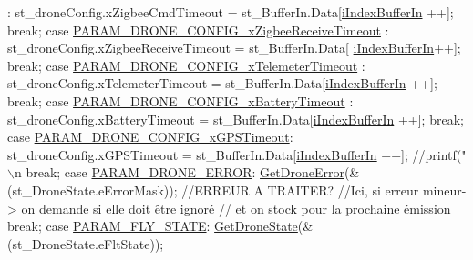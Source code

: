\begin{DoxyCode}
      :
            st\_droneConfig.xZigbeeCmdTimeout = st\_BufferIn.Data[\hyperlink{classZigBee_a2b6ec705974d8db622f3eb00efeb9ad8}{iIndexBufferIn}
      ++];
            \textcolor{keywordflow}{break};
        \textcolor{keywordflow}{case} \hyperlink{typdefUart_8h_a7fdf1e7bfbebe0c7a2eb84a10e069632af2f4da476de6fc43e2118826e9e8bc9b}{PARAM\_DRONE\_CONFIG\_xZigbeeReceiveTimeout}
      :
            st\_droneConfig.xZigbeeReceiveTimeout = st\_BufferIn.Data[
      \hyperlink{classZigBee_a2b6ec705974d8db622f3eb00efeb9ad8}{iIndexBufferIn}++];
            \textcolor{keywordflow}{break};
        \textcolor{keywordflow}{case} \hyperlink{typdefUart_8h_a7fdf1e7bfbebe0c7a2eb84a10e069632aa01da571181efda4755ff66c627d007e}{PARAM\_DRONE\_CONFIG\_xTelemeterTimeout}
      :
            st\_droneConfig.xTelemeterTimeout = st\_BufferIn.Data[\hyperlink{classZigBee_a2b6ec705974d8db622f3eb00efeb9ad8}{iIndexBufferIn}
      ++];
            \textcolor{keywordflow}{break};
        \textcolor{keywordflow}{case} \hyperlink{typdefUart_8h_a7fdf1e7bfbebe0c7a2eb84a10e069632a1298f95dd257a888bde3262a86c4d136}{PARAM\_DRONE\_CONFIG\_xBatteryTimeout}
      :
            st\_droneConfig.xBatteryTimeout = st\_BufferIn.Data[\hyperlink{classZigBee_a2b6ec705974d8db622f3eb00efeb9ad8}{iIndexBufferIn}
      ++];
            \textcolor{keywordflow}{break};
        \textcolor{keywordflow}{case} \hyperlink{typdefUart_8h_a7fdf1e7bfbebe0c7a2eb84a10e069632a9cd65980217626ee680a9055e78d4131}{PARAM\_DRONE\_CONFIG\_xGPSTimeout}:
            st\_droneConfig.xGPSTimeout = st\_BufferIn.Data[\hyperlink{classZigBee_a2b6ec705974d8db622f3eb00efeb9ad8}{iIndexBufferIn}
      ++];
            \textcolor{comment}{//printf("\(\backslash\)n%
            \textcolor{keywordflow}{break};
        \textcolor{keywordflow}{case} \hyperlink{typdefUart_8h_a7fdf1e7bfbebe0c7a2eb84a10e069632a01acce445241211e5ef11328c1b8d1e2}{PARAM\_DRONE\_ERROR}:
            \hyperlink{classZigBee_ac4ea5e99c087a7e536d97a41ef8145d2}{GetDroneError}(&(st\_DroneState.eErrorMask));
            \textcolor{comment}{//ERREUR A TRAITER?}
            \textcolor{comment}{//Ici, si erreur mineur-> on demande si elle doit être ignoré}
                                   \textcolor{comment}{// et on stock pour la prochaine émission}
            \textcolor{keywordflow}{break};
        \textcolor{keywordflow}{case} \hyperlink{typdefUart_8h_a7fdf1e7bfbebe0c7a2eb84a10e069632a8f2ad857311b305a40e6294736196f47}{PARAM\_FLY\_STATE}:
            \hyperlink{classZigBee_a246506a3d990d052a37a4d816b88f3e6}{GetDroneState}(&(st\_DroneState.eFltState));
}
\end{DoxyCode}
